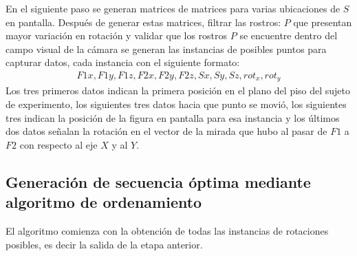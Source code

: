 	 En el siguiente paso se generan matrices de matrices para varias ubicaciones de $S$ en pantalla. Después de generar estas matrices, filtrar las rostros: $P$ que presentan mayor variación en rotación y validar que los rostros $P$ se encuentre dentro del campo visual de la cámara se generan las instancias de posibles puntos para capturar datos, cada instancia con el siguiente formato:
	 \begin{eqnarray}
		F1x, F1y, F1z, F2x, F2y, F2z, Sx, Sy, Sz, rot_x, rot_y
	 \end{eqnarray}
	 Los tres primeros datos indican la primera posición en el plano del piso del sujeto de experimento, los siguientes tres datos hacia que punto se movió, los siguientes tres indican la posición de la figura en pantalla para esa instancia y los últimos dos datos señalan la rotación en el vector de la mirada que hubo al pasar de $F1$ a $F2$ con respecto al eje $X$ y al $Y$. 
 
	 \subsection{Generación de secuencia óptima mediante algoritmo de ordenamiento}
	 El algoritmo comienza con la obtención de todas las instancias de rotaciones posibles, es decir la salida de la etapa anterior.
   
